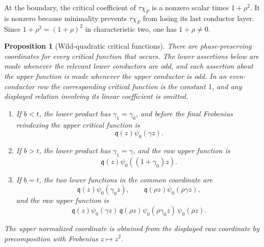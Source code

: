 \documentclass[11pt]{amsart}
\newtheorem{proposition}[theorem]{Proposition}
\theoremstyle{definition}
\theoremstyle{remark}
\begin{document}
At the boundary, the critical coefficient of $\tau\chi_F$ is a
nonzero scalar times $1+\rho^2$.  It is nonzero because minimality
prevents $\tau\chi_F$ from losing its last conductor layer.  Since
$1+\rho^2=(1+\rho)^2$ in characteristic two, one has
$1+\rho\ne0$.

\begin{proposition}[Wild-quadratic critical functions]
\label{prop:quadratic-critical-functions}
There are phase-preserving coordinates for every critical function
that occurs.  The lower assertions below are made whenever the relevant
lower conductors are odd, and each assertion about the upper function
is made whenever the upper conductor is odd.  In an even-conductor row
the corresponding critical function is the constant $1$, and any
displayed relation involving its linear coefficient is omitted.
\begin{enumerate}[label=(\roman*)]
\item If $b<t$, the lower product has $\gamma_1=\gamma_0$, and before
the final Frobenius reindexing the upper critical function is
\[
 \mathfrak q(z)\psi_0(\gamma z).
\]
\item If $b>t$, the lower product has $\gamma_1=\gamma$, and the raw
upper function is
\[
 \mathfrak q(z)\psi_0((1+\gamma_0)z).
\]
\item If $b=t$, the two lower functions in the common coordinate are
\[
 \mathfrak q(z)\psi_0(\gamma_0z),
 \qquad
 \mathfrak q(\rho z)\psi_0(\rho\gamma z),
\]
and the raw upper function is
\begin{equation}\label{eq:raw-upper-quadratic-identities}
 \mathfrak q(z)\psi_0(\gamma z)\,
 \mathfrak q(\rho z)\psi_0(\rho\gamma_0z)\,
 \psi_0(\rho z).
\end{equation}
\end{enumerate}
The upper normalized coordinate is obtained from the displayed raw
coordinate by precomposition with Frobenius $z\mapsto z^2$.
\end{proposition}
\end{document}
